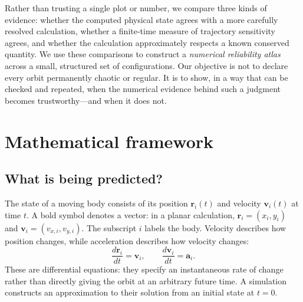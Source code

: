 \documentclass[10pt,letterpaper,twocolumn]{article}
\begin{document}
Rather than trusting a single plot or number, we compare three kinds of evidence: whether the computed physical state agrees with a more carefully resolved calculation, whether a finite-time measure of trajectory sensitivity agrees, and whether the calculation approximately respects a known conserved quantity. We use these comparisons to construct a \emph{numerical reliability atlas} across a small, structured set of configurations. Our objective is not to declare every orbit permanently chaotic or regular. It is to show, in a way that can be checked and repeated, when the numerical evidence behind such a judgment becomes trustworthy---and when it does not.

\section{Mathematical framework}
\subsection{What is being predicted?}
The state of a moving body consists of its position $\boldsymbol r_i(t)$ and velocity $\boldsymbol v_i(t)$ at time $t$. A bold symbol denotes a vector: in a planar calculation, $\boldsymbol r_i=(x_i,y_i)$ and $\boldsymbol v_i=(v_{x,i},v_{y,i})$. The subscript $i$ labels the body. Velocity describes how position changes, while acceleration describes how velocity changes:
\begin{equation}
 \frac{d\boldsymbol r_i}{dt}=\boldsymbol v_i,\qquad
 \frac{d\boldsymbol v_i}{dt}=\boldsymbol a_i.
\end{equation}
These are differential equations: they specify an instantaneous rate of change rather than directly giving the orbit at an arbitrary future time. A simulation constructs an approximation to their solution from an initial state at $t=0$.
\end{document}

